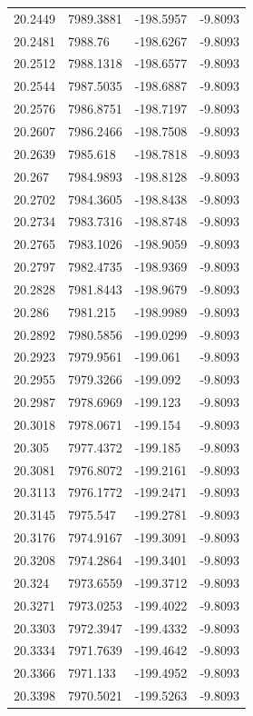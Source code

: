 \begin{table}[H]
\begin{tabular}{llll}
20.2449 & 7989.3881 & -198.5957 & -9.8093 \\
20.2481 & 7988.76 & -198.6267 & -9.8093 \\
20.2512 & 7988.1318 & -198.6577 & -9.8093 \\
20.2544 & 7987.5035 & -198.6887 & -9.8093 \\
20.2576 & 7986.8751 & -198.7197 & -9.8093 \\
20.2607 & 7986.2466 & -198.7508 & -9.8093 \\
20.2639 & 7985.618 & -198.7818 & -9.8093 \\
20.267 & 7984.9893 & -198.8128 & -9.8093 \\
20.2702 & 7984.3605 & -198.8438 & -9.8093 \\
20.2734 & 7983.7316 & -198.8748 & -9.8093 \\
20.2765 & 7983.1026 & -198.9059 & -9.8093 \\
20.2797 & 7982.4735 & -198.9369 & -9.8093 \\
20.2828 & 7981.8443 & -198.9679 & -9.8093 \\
20.286 & 7981.215 & -198.9989 & -9.8093 \\
20.2892 & 7980.5856 & -199.0299 & -9.8093 \\
20.2923 & 7979.9561 & -199.061 & -9.8093 \\
20.2955 & 7979.3266 & -199.092 & -9.8093 \\
20.2987 & 7978.6969 & -199.123 & -9.8093 \\
20.3018 & 7978.0671 & -199.154 & -9.8093 \\
20.305 & 7977.4372 & -199.185 & -9.8093 \\
20.3081 & 7976.8072 & -199.2161 & -9.8093 \\
20.3113 & 7976.1772 & -199.2471 & -9.8093 \\
20.3145 & 7975.547 & -199.2781 & -9.8093 \\
20.3176 & 7974.9167 & -199.3091 & -9.8093 \\
20.3208 & 7974.2864 & -199.3401 & -9.8093 \\
20.324 & 7973.6559 & -199.3712 & -9.8093 \\
20.3271 & 7973.0253 & -199.4022 & -9.8093 \\
20.3303 & 7972.3947 & -199.4332 & -9.8093 \\
20.3334 & 7971.7639 & -199.4642 & -9.8093 \\
20.3366 & 7971.133 & -199.4952 & -9.8093 \\
20.3398 & 7970.5021 & -199.5263 & -9.8093 \\

\end{tabular}
\end{table}
